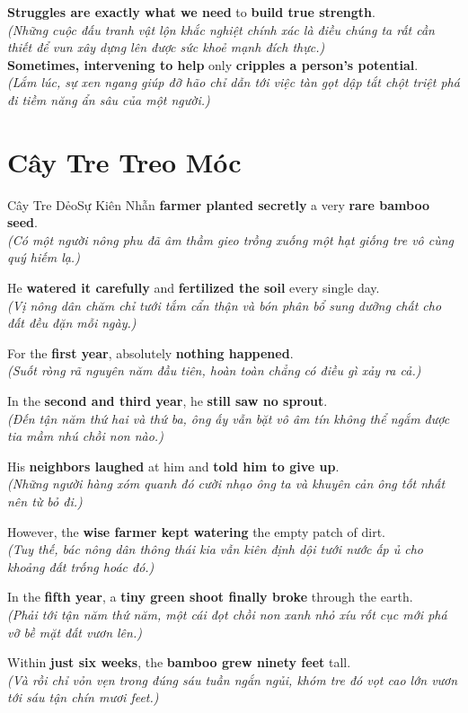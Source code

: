 \begin{baihoc}
  \textbf{Struggles are exactly what we need} to \textbf{build true strength}.\\
  \textit{(Những cuộc đấu tranh vật lộn khắc nghiệt chính xác là điều chúng ta rất cần thiết để vun xây dựng lên được sức khoẻ mạnh đích thực.)}\\
  \textbf{Sometimes, intervening to help} only \textbf{cripples a person's potential}.\\
  \textit{(Lắm lúc, sự xen ngang giúp đỡ hão chỉ dẫn tới việc tàn gọt dập tắt chột triệt phá đi tiềm năng ẩn sâu của một người.)}
\end{baihoc}

\vspace{0.8cm}

\ngayDay{}
\section{Cây Tre Treo Móc}
\begin{truyen}{Cây Tre Dẻo}{Sự Kiên Nhẫn}
 \textbf{farmer planted secretly} a very \textbf{rare bamboo seed}.\\
\textit{(Có một người nông phu đã âm thầm gieo trồng xuống một hạt giống tre vô cùng quý hiếm lạ.)}

He \textbf{watered it carefully} and \textbf{fertilized the soil} every single day.\\
\textit{(Vị nông dân chăm chỉ tưới tắm cẩn thận và bón phân bổ sung dưỡng chất cho đất đều đặn mỗi ngày.)}

For the \textbf{first year}, absolutely \textbf{nothing happened}.\\
\textit{(Suốt ròng rã nguyên năm đầu tiên, hoàn toàn chẳng có điều gì xảy ra cả.)}

In the \textbf{second and third year}, he \textbf{still saw no sprout}.\\
\textit{(Đến tận năm thứ hai và thứ ba, ông ấy vẫn bặt vô âm tín không thể ngắm được tia mầm nhú chồi non nào.)}

His \textbf{neighbors laughed} at him and \textbf{told him to give up}.\\
\textit{(Những người hàng xóm quanh đó cười nhạo ông ta và khuyên cản ông tốt nhất nên từ bỏ đi.)}

However, the \textbf{wise farmer kept watering} the empty patch of dirt.\\
\textit{(Tuy thế, bác nông dân thông thái kia vẫn kiên định dội tưới nước ấp ủ cho khoảng đất trống hoác đó.)}

In the \textbf{fifth year}, a \textbf{tiny green shoot finally broke} through the earth.\\
\textit{(Phải tới tận năm thứ năm, một cái đọt chồi non xanh nhỏ xíu rốt cục mới phá vỡ bề mặt đất vươn lên.)}

Within \textbf{just six weeks}, the \textbf{bamboo grew ninety feet} tall.\\
\textit{(Và rồi chỉ vỏn vẹn trong đúng sáu tuần ngắn ngủi, khóm tre đó vọt cao lớn vươn tới sáu tận chín mươi feet.)}
\end{truyen}

